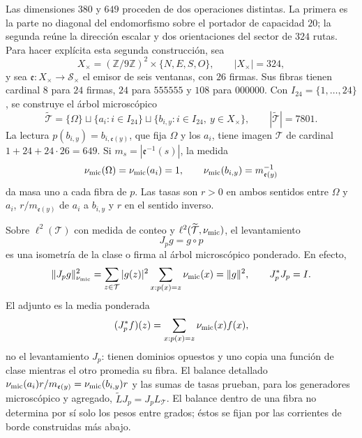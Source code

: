 Las dimensiones $380$ y $649$ proceden de dos operaciones distintas. La
primera es la parte no diagonal del endomorfismo sobre el portador de
capacidad $20$; la segunda reúne la dirección escalar y dos orientaciones
del sector de $324$ rutas. Para hacer explícita esta segunda construcción,
sea
\[
 X_\times=(\mathbb Z/9\mathbb Z)^2\times\{N,E,S,O\},
 \qquad |X_\times|=324,
\]
y sea $\mathfrak e:X_\times\to\mathcal S_\times$ el emisor de seis
ventanas, con $26$ firmas. Sus fibras tienen cardinal $8$ para $24$ firmas,
$24$ para $555555$ y $108$ para $000000$. Con
$I_{24}=\{1,\ldots,24\}$, se construye el árbol microscópico
\begin{equation}
 \widetilde{\mathcal T}=\{\Omega\}\sqcup\{a_i:i\in I_{24}\}
 \sqcup\{b_{i,y}:i\in I_{24},\ y\in X_\times\},
 \qquad |\widetilde{\mathcal T}|=7801.
 \label{v:eq:arbol-microscopico-7801}
\end{equation}
La lectura $p(b_{i,y})=b_{i,\mathfrak e(y)}$, que fija $\Omega$ y los
$a_i$, tiene imagen $\mathcal T$ de cardinal
$1+24+24\cdot26=649$. Si
$m_s=|\mathfrak e^{-1}(s)|$, la medida
\begin{equation}
 \nu_{\rm mic}(\Omega)=\nu_{\rm mic}(a_i)=1,
 \qquad \nu_{\rm mic}(b_{i,y})=m_{\mathfrak e(y)}^{-1}
 \label{v:eq:medida-arbol-microscopico}
\end{equation}
da masa uno a cada fibra de $p$. Las tasas son $r>0$ en ambos sentidos
entre $\Omega$ y $a_i$, $r/m_{\mathfrak e(y)}$ de $a_i$ a $b_{i,y}$
y $r$ en el sentido inverso.

Sobre $\ell^2(\mathcal T)$ con medida de conteo y
$\ell^2(\widetilde{\mathcal T},\nu_{\rm mic})$, el levantamiento
\begin{equation}
 J_p g=g\circ p
 \label{v:eq:levantamiento-fibras-Jp}
\end{equation}
es una isometría de la clase o firma al árbol microscópico ponderado.
En efecto,
\[
 \|J_pg\|_{\nu_{\rm mic}}^2
 =\sum_{z\in\mathcal T}|g(z)|^2
   \sum_{x:p(x)=z}\nu_{\rm mic}(x)=\|g\|^2,
 \qquad J_p^*J_p=I.
\]
El adjunto es la media ponderada
\begin{equation}
 (J_p^*f)(z)=\sum_{x:p(x)=z}\nu_{\rm mic}(x)f(x),
 \label{v:eq:adjunto-fibras-Jp}
\end{equation}
no el levantamiento $J_p$: tienen dominios opuestos y uno copia una función
de clase mientras el otro promedia su fibra. El balance detallado
$\nu_{\rm mic}(a_i)r/m_{\mathfrak e(y)}
=\nu_{\rm mic}(b_{i,y})r$ y las sumas de tasas prueban, para los
generadores microscópico y agregado,
$\widetilde L J_p=J_pL_{\mathcal T}$. El balance dentro de una fibra no
determina por sí solo los pesos entre grados; éstos se fijan por las
corrientes de borde construidas más abajo.

